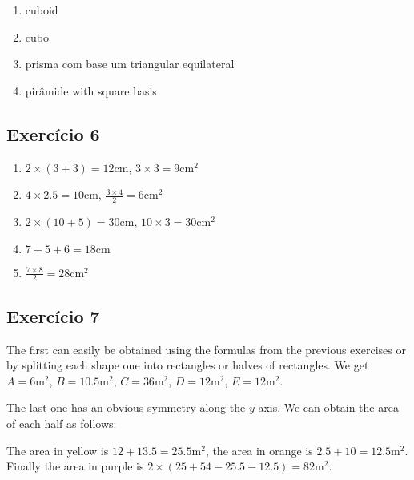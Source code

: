\begin{enumerate}
\item cuboid
\item cubo
\item prisma com base um triangular equilateral
\item pirâmide with square basis
\end{enumerate}

\subsection*{Exercício 6}

\begin{enumerate}
\item $2 \times (3+3) = 12\text{cm}$, $3 \times 3 = 9\text{cm}^2$
\item $4 \times 2.5 = 10\text{cm}$, $\frac{3 \times 4}{2} = 6\text{cm}^2$
\item $2 \times {(10 + 5)} = 30\text{cm}$, $10 \times 3 = 30\text{cm}^2$
\item $7+5+6=18\text{cm}$
\item $\frac{7 \times 8}{2} = 28 \text{cm}^2$
\end{enumerate}

\subsection*{Exercício 7}

The first can easily be obtained using the formulas from the previous exercises
or by splitting each shape one into rectangles or halves of rectangles.
We get $A=6 \text{m}^2$, $B=10.5 \text{m}^2$, $C=36\text{m}^2$, $D=12\text{m}^2$,
$E=12\text{m}^2$.

The last one has an obvious symmetry along the $y$-axis. We can obtain the area
of each half as follows:
  
\begin{center}
\end{center}
The area in yellow is $12 + 13.5 = 25.5\text{m}^2$, the area
in orange is $2.5 + 10 = 12.5 \text{m}^2$. Finally the area in purple is
$2 \times {(25 + 54 - 25.5 - 12.5)} = 82 \text{m}^2$.
